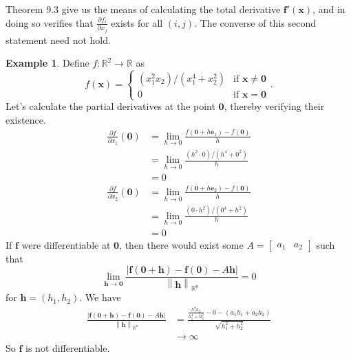 \documentclass{article}
\newcommand{\R}{\mathbb{R}}
\newcommand{\x}{\mathbf{x}}
\newcommand{\f}{\mathbf{f}}
\newcommand{\ze}{\mathbf{0}}
\newcommand{\norm}[1]{\left\lVert#1\right\rVert}
\theoremstyle{definition}
\newtheorem{example}{Example}[section]
\begin{document}
Theorem 9.3 give us the means of calculating the total derivative $ \f'(\x) $, and in doing so verifies that $ \frac{\partial f_i}{\partial x_j} $ exists for all $ (i,j) $. The converse of this second statement need not hold. 
\begin{example}
	Define $ f:\R^2\to\R $ as 
	$$f(\x)= \begin{cases}
		(x_1^2x_2)/(x_1^4+x_2^2) & \text{if }\x\neq\ze\\ 
		0 & \text{if }\x=\ze
	\end{cases}.$$
Let's calculate the partial derivatives at the point $ \ze $, thereby verifying their existence. 
\begin{align*}
 \frac{\partial f}{\partial x_1}(\ze) &= \lim\limits_{h\to 0}\frac{f( \ze + h\mathbf e_1 )-f(\ze)}{h} \\
 &= \lim\limits_{h\to 0}\frac{(h^2\cdot 0)/(h^4+0^2)}{h}\\ & = 0 \\
  \frac{\partial f}{\partial x_2}(\ze) &= \lim\limits_{h\to 0}\frac{f( \ze + h\mathbf e_2 )-f(\ze)}{h} \\
 &= \lim\limits_{h\to 0}\frac{(0\cdot h^2)/(0^4+h^2)}{h}\\ & = 0 
\end{align*}
If $ \f $ were differentiable at $ \ze $, then there would exist some $ A=\begin{bmatrix}
	a_1 & a_2
\end{bmatrix} $ such that 
$$\lim\limits_{\mathbf h\to \ze}\frac{|{\f(\ze +\mathbf h) - \f(\ze)-A\mathbf{h}}|}{\norm{\mathbf h}_{\R^n}} = 0$$ for $ \mathbf h = (h_1,h_2) $. 
We have \begin{align*}
\frac{|{\f(\ze +\mathbf h) - \f(\ze)-A\mathbf{h}}|}{\norm{\mathbf h}_{\R^n}}& = \frac{\frac{h_1^2h_2}{h_1^4+h_2^2} - 0 - (a_1h_1 +a_2h_2) }{\sqrt{h_1^2 + h_2^2}}\\ & \to \infty
\end{align*}
So $ \f $ is not differentiable. 
\end{example}
\end{document}
